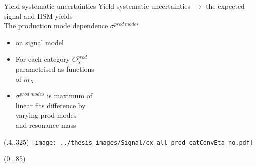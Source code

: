 \documentclass[10pt,UKenglish, leqno, xcolor = dvipsnames]{beamer}
\begin{document}
	\begin{frame}{Yield systematic uncertainties}
		\vfill
		Yield systematic uncertainties $\to$ the expected signal and HSM yields\\
		The production mode dependence $\sigma^{prod\ modes}$
		\begin{itemize}
			\item on signal model
			\item For each category $C_X^{prod}$\\ parametrised as functions\\ of $m_X$
			\item $\sigma^{prod\ modes}$ is maximum of \\linear fits difference by\\ varying prod modes\\ and resonance mass
		\end{itemize}
		\vspace{.5cm}
		\vfill
		\begin{textblock}{1}(.4,.325)
			\texttt{[image: ../thesis\_images/Signal/cx\_all\_prod\_catConvEta\_no.pdf]}\\	
		\end{textblock}	
		
		\begin{textblock}{1}(0.,.85)
			\begin{figure}
			\end{figure}
		\end{textblock}
	\end{frame}
\end{document}
